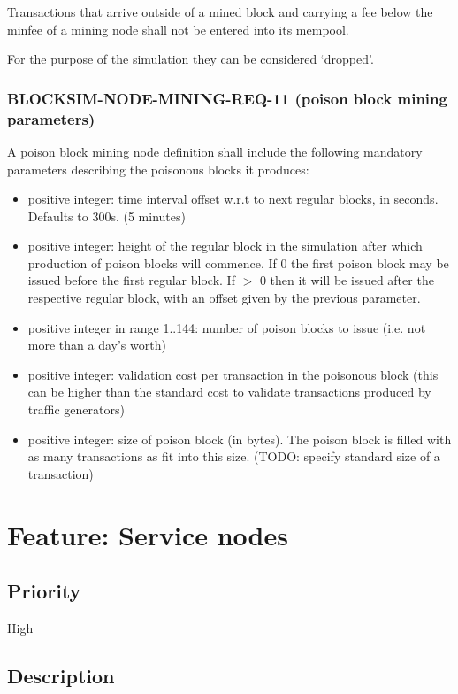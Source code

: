 \documentclass{scrreprt}
\begin{document}
Transactions that arrive outside of a mined block and carrying a fee below
the minfee of a mining node shall not be entered into its mempool.

For the purpose of the simulation they can be considered `dropped'.

\subsubsection{BLOCKSIM-NODE-MINING-REQ-11 (poison block mining parameters)}

A poison block mining node definition shall include the following mandatory
parameters describing the poisonous blocks it produces:

\begin{itemize}
   \item positive integer: time interval offset w.r.t to next regular blocks, in seconds. Defaults to 300s. (5 minutes)
   \item positive integer: height of the regular block in the simulation after which production of poison blocks will commence. If 0 the first poison block may be issued before the first regular block. If $>$ 0 then it will be issued after the respective regular block, with an offset given by the previous parameter.
   \item positive integer in range 1..144: number of poison blocks to issue (i.e. not more than a day's worth)
   \item positive integer: validation cost per transaction in the poisonous block (this can be higher than the standard cost to validate transactions produced by traffic generators)
   \item positive integer: size of poison block (in bytes). The poison block is filled with as many transactions as fit into this size. (TODO: specify standard size of a transaction)
\end{itemize}



\section{Feature: Service nodes}

\subsection{Priority}

High

\subsection{Description}
\end{document}
